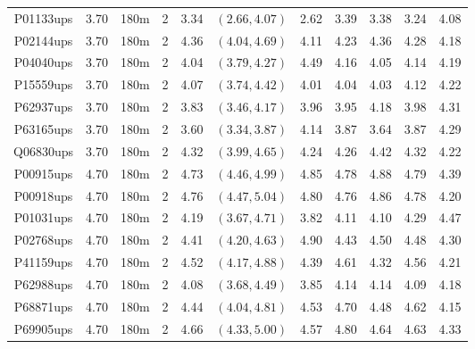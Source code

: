 \begin{landscape}
\begin{longtable}{cccc|cc|ccccc}
  P01133ups & 3.70 & 180m &   2 & 3.34 & $(2.66, 4.07)$ & 2.62 & 3.39 & 3.38 & 3.24 & 4.08 \\ 
  P02144ups & 3.70 & 180m &   2 & 4.36 & $(4.04, 4.69)$ & 4.11 & 4.23 & 4.36 & 4.28 & 4.18 \\ 
  P04040ups & 3.70 & 180m &   2 & 4.04 & $(3.79, 4.27)$ & 4.49 & 4.16 & 4.05 & 4.14 & 4.19 \\ 
  P15559ups & 3.70 & 180m &   2 & 4.07 & $(3.74, 4.42)$ & 4.01 & 4.04 & 4.03 & 4.12 & 4.22 \\ 
  P62937ups & 3.70 & 180m &   2 & 3.83 & $(3.46, 4.17)$ & 3.96 & 3.95 & 4.18 & 3.98 & 4.31 \\ 
  P63165ups & 3.70 & 180m &   2 & 3.60 & $(3.34, 3.87)$ & 4.14 & 3.87 & 3.64 & 3.87 & 4.29 \\ 
  Q06830ups & 3.70 & 180m &   2 & 4.32 & $(3.99, 4.65)$ & 4.24 & 4.26 & 4.42 & 4.32 & 4.22 \\ 
  P00915ups & 4.70 & 180m &   2 & 4.73 & $(4.46, 4.99)$ & 4.85 & 4.78 & 4.88 & 4.79 & 4.39 \\ 
  P00918ups & 4.70 & 180m &   2 & 4.76 & $(4.47, 5.04)$ & 4.80 & 4.76 & 4.86 & 4.78 & 4.20 \\ 
  P01031ups & 4.70 & 180m &   2 & 4.19 & $(3.67, 4.71)$ & 3.82 & 4.11 & 4.10 & 4.29 & 4.47 \\ 
  P02768ups & 4.70 & 180m &   2 & 4.41 & $(4.20, 4.63)$ & 4.90 & 4.43 & 4.50 & 4.48 & 4.30 \\ 
  P41159ups & 4.70 & 180m &   2 & 4.52 & $(4.17, 4.88)$ & 4.39 & 4.61 & 4.32 & 4.56 & 4.21 \\ 
  P62988ups & 4.70 & 180m &   2 & 4.08 & $(3.68, 4.49)$ & 3.85 & 4.14 & 4.14 & 4.09 & 4.18 \\ 
  P68871ups & 4.70 & 180m &   2 & 4.44 & $(4.04, 4.81)$ & 4.53 & 4.70 & 4.48 & 4.62 & 4.15 \\ 
  P69905ups & 4.70 & 180m &   2 & 4.66 & $(4.33, 5.00)$ & 4.57 & 4.80 & 4.64 & 4.63 & 4.33 \\ 
   \hline
\end{longtable}
\end{landscape}
\clearpage


